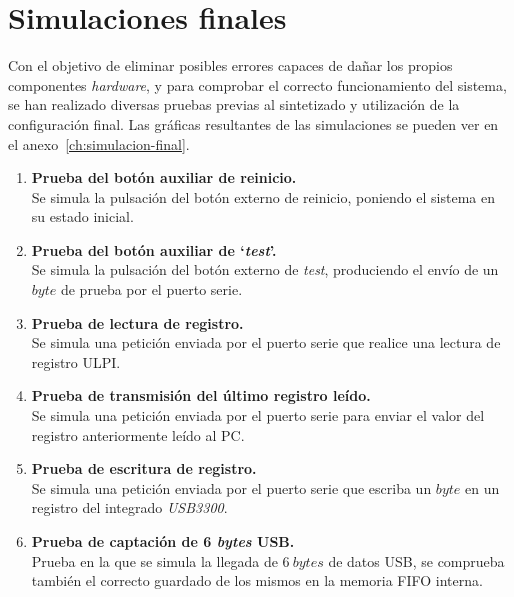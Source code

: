 \section{Simulaciones finales}
Con el objetivo de eliminar posibles errores capaces de dañar los propios componentes \emph{hardware}, y para comprobar el correcto funcionamiento del sistema, se han realizado diversas pruebas previas al sintetizado y utilización de la configuración final. Las gráficas resultantes de las simulaciones se pueden ver en el anexo~\ref{ch:simulacion-final}.

\begin{enumerate}
    \item \textbf{Prueba del botón auxiliar de reinicio.} \\
    Se simula la pulsación del botón externo de reinicio, poniendo el sistema en su estado inicial.
    
    \item \textbf{Prueba del botón auxiliar de `\emph{test}'.} \\
    Se simula la pulsación del botón externo de \emph{test}, produciendo el envío de un $byte$ de prueba por el puerto serie.

    \item \textbf{Prueba de lectura de registro.} \\
    Se simula una petición enviada por el puerto serie que realice una lectura de registro ULPI.
    
    \item \textbf{Prueba de transmisión del último registro leído.} \\
    Se simula una petición enviada por el puerto serie para enviar el valor del registro anteriormente leído al PC.
    
    \item \textbf{Prueba de escritura de registro.} \\
    Se simula una petición enviada por el puerto serie que escriba un $byte$ en un registro del integrado \emph{USB3300}.
    
    \item \textbf{Prueba de captación de 6 \emph{bytes} USB.}{\label{enum:captacion_6}} \\
    Prueba en la que se simula la llegada de $6~bytes$ de datos USB, se comprueba también el correcto guardado de los mismos en la memoria FIFO interna.
    

\end{enumerate}
